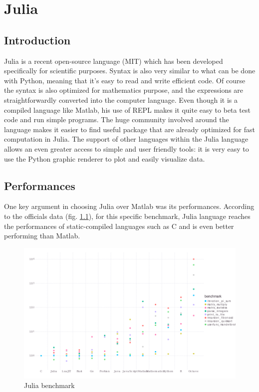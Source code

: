 
\chapter{Julia}
\label{chap:julia}

\section{Introduction}

Julia is a recent open-source language (MIT) which has been developed specifically for scientific purposes. Syntax is also very similar to what can be done with Python, meaning that it's easy to read and write efficient code. Of course the syntax is also optimized for mathematics purpose, and the expressions are straightforwardly converted into the computer language. Even though it is a compiled language like Matlab, his use of REPL makes it quite easy to beta test code and run simple programs. The huge community involved around the language makes it easier to find useful package that are already optimized for fast computation in Julia. The support of other languages within the Julia language allows an even greater access to simple and user friendly tools: it is very easy to use the Python graphic renderer to plot and easily visualize data.

\section{Performances}

One key argument in choosing Julia over Matlab was its performances. According to the officials data (fig. \ref{fig:7}), for this specific benchmark, Julia language reaches the performances of static-compiled languages such as C and is even better performing than Matlab.

\begin{figure}
    \centering
    \includegraphics*[width=.6\paperwidth]{figures/benchmarks.png}
    \caption{Julia benchmark \label{fig:7}}
\end{figure}

